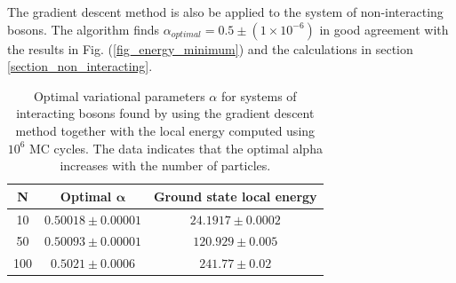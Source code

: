 The gradient descent method is also be applied to the system of non-interacting bosons. The algorithm finds $\alpha_{optimal} = 0.5 \pm (1\times10^{-6})$ in good agreement with the results in Fig. (\ref{fig_energy_minimum}) and the calculations in section \ref{section_non_interacting}.

\begin{table}[H]
\caption{Optimal variational parameters $\alpha$ for systems of interacting bosons found by using the gradient descent method together with the local energy computed using $10^6$ MC cycles. The data indicates that the optimal alpha increases with the number of particles.}
\centering
\begin{tabular}{ c c c}
\textbf{N}& \textbf{Optimal $\boldsymbol{\alpha}$}  & \textbf{Ground state local energy}\\ \hline
10 & $0.50018 \pm 0.00001$ &  $24.1917 \pm 0.0002$\\ 
50 & $0.50093\pm0.00001$     &  $120.929 \pm 0.005$ \\
100 & $0.5021 \pm 0.0006$    &   $241.77 \pm 0.02$  \\
\end{tabular}
\label{tab_optimal_alpha}
\end{table} 
